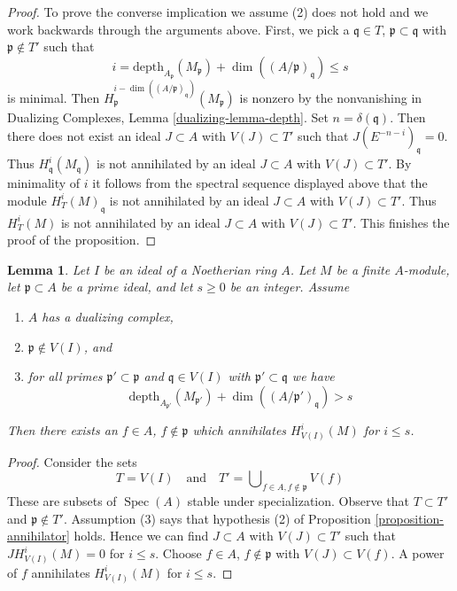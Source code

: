\documentclass{stacks-project}
\theoremstyle{plain}
\newtheorem{lemma}[subsection]{Lemma}
\theoremstyle{definition}
\theoremstyle{remark}
\numberwithin{equation}{subsection}
\def\Spec{\mathop{\mathrm{Spec}}}
\begin{document}
\begin{proof}
\medskip\noindent
To prove the converse implication we assume (2) does not hold
and we work backwards through the arguments above. First, we pick a
$\mathfrak q \in T$, $\mathfrak p \subset \mathfrak q$
with $\mathfrak p \not \in T'$ such that
$$
i = \text{depth}_{A_\mathfrak p}(M_\mathfrak p) +
\dim((A/\mathfrak p)_\mathfrak q) \leq s
$$
is minimal. Then
$H^{i - \dim((A/\mathfrak p)_\mathfrak q)}_\mathfrak p(M_\mathfrak p)$
is nonzero by the nonvanishing in
Dualizing Complexes, Lemma \ref{dualizing-lemma-depth}.
Set $n = \delta(\mathfrak q)$. Then
there does not exist an ideal $J \subset A$ with $V(J) \subset T'$
such that $J(E^{-n - i})_\mathfrak q = 0$.
Thus $H^i_\mathfrak q(M_\mathfrak q)$ is not
annihilated by an ideal $J \subset A$ with $V(J) \subset T'$.
By minimality of $i$ it follows from the spectral sequence displayed above
that the module $H^i_T(M)_\mathfrak q$
is not annihilated by an ideal $J \subset A$
with $V(J) \subset T'$. Thus $H^i_T(M)$
is not annihilated by an ideal $J \subset A$
with $V(J) \subset T'$. This finishes the proof of the proposition.
\end{proof}

\begin{lemma}
\label{lemma-kill-local-cohomology-at-prime}
Let $I$ be an ideal of a Noetherian ring $A$.
Let $M$ be a finite $A$-module, let $\mathfrak p \subset A$ be a prime
ideal, and let $s \geq 0$ be an integer. Assume
\begin{enumerate}
\item $A$ has a dualizing complex,
\item $\mathfrak p \not \in V(I)$, and
\item for all primes $\mathfrak p' \subset \mathfrak p$
and $\mathfrak q \in V(I)$ with $\mathfrak p' \subset \mathfrak q$ we have
$$
\text{depth}_{A_{\mathfrak p'}}(M_{\mathfrak p'}) +
\dim((A/\mathfrak p')_\mathfrak q) > s
$$
\end{enumerate}
Then there exists an $f \in A$, $f \not \in \mathfrak p$ which annihilates
$H^i_{V(I)}(M)$ for $i \leq s$.
\end{lemma}

\begin{proof}
Consider the sets
$$
T = V(I)
\quad\text{and}\quad
T' = \bigcup\nolimits_{f \in A, f \not \in \mathfrak p} V(f)
$$
These are subsets of $\Spec(A)$ stable under specialization.
Observe that $T \subset T'$ and $\mathfrak p \not \in T'$.
Assumption (3) says that hypothesis (2) of
Proposition \ref{proposition-annihilator} holds.
Hence we can find $J \subset A$ with $V(J) \subset T'$
such that $J H^i_{V(I)}(M) = 0$ for $i \leq s$.
Choose $f \in A$, $f \not \in \mathfrak p$ with $V(J) \subset V(f)$.
A power of $f$ annihilates $H^i_{V(I)}(M)$ for $i \leq s$.
\end{proof}
\end{document}
